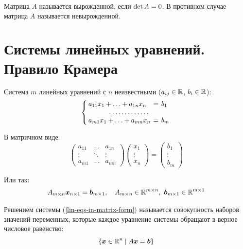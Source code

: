 \documentclass[a4paper,12pt]{article}
\begin{document}
  \begin{definition}
    Матрица $A$ называется вырожденной, если $\det A \hm= 0$.
    В противном случае матрица $A$ называется невырожденной.
  \end{definition}
  
  
  
  \section{Системы линейныx уравнений. Правило Крамера}
  
  Система $m$ линейных уравнений с $n$ неизвестными ($a_{ij} \hm\in \RR$, $b_i \hm\in \RR$):
  \[
    \renewcommand{\arraycolsep}{2pt}
    \left\{
      \begin{array}{lcl}
        a_{11} x_1 + \ldots + a_{1n} x_n & = & b_1\\
        \hdotsfor{3}\\
        a_{m1} x_1 + \ldots + a_{mn} x_n & = & b_m
      \end{array}
    \right.
  \]
  
  В матричном виде:
  \[
    \begin{pmatrix}
      a_{11} & \ldots & a_{1n}\\
      \vdots & \ddots & \vdots\\
      a_{m1} & \ldots & a_{mn}
    \end{pmatrix}
    \begin{pmatrix}
      x_1\\
      \vdots\\
      x_n
    \end{pmatrix}
    =
    \begin{pmatrix}
      b_1\\
      \vdots\\
      b_m
    \end{pmatrix}
  \]
  
  Или так:
  \begin{equation}\label{lin-eqs-in-matrix-form}
    A_{m \times n} \bds x_{n \times 1} = \bds b_{m \times 1},\quad A_{m \times n} \hm\in \RR^{m \times n},\ \bds b_{m \times 1} \in \RR^{m \times 1}
  \end{equation}
  
  \begin{definition}
    Решением системы (\ref{lin-eqs-in-matrix-form}) называется совокупность наборов значений переменных, которые каждое уравнение системы обращают в верное числовое равенство:
    \[
      \{\boldsymbol x \in \operatorname{\mathbb R}^n \mid A \boldsymbol x = \boldsymbol b\}
    \]
  \end{definition}
  
\end{document}
